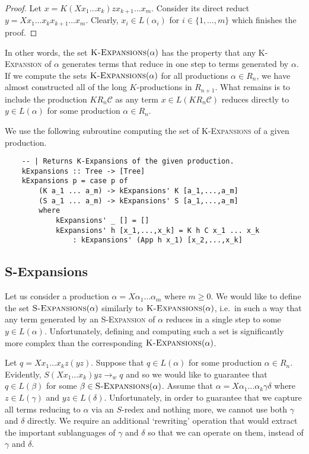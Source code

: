 \documentclass[11pt,a4paper]{amsart}
\theoremstyle{definition}
\newcommand{\KExpansions}[1]{\textsc{K-Expansions}(#1)}
\newcommand{\SExpansions}[1]{\textsc{S-Expansions}(#1)}
\begin{document}
\begin{proof}
    Let $x = K (X x_1 \ldots x_k) z x_{k+1} \ldots x_m$. Consider its direct reduct $y = X x_1 \ldots x_k x_{k+1} \ldots x_m$. Clearly, $x_i \in L(\alpha_i)$ for $i \in \{1,\ldots,m\}$ which finishes the proof.
\end{proof}

In other words, the set $\KExpansions{\alpha}$ has the property that any \textsc{K-Expansion} of $\alpha$ generates terms that reduce in one step to terms generated by $\alpha$. If we compute the sets $\KExpansions{\alpha}$ for all productions $\alpha \in R_n$, we have almost constructed all of the long $K$-productions in $R_{n+1}$. What remains is to include the production $K R_n \mathcal{C}$ as any term $x \in L(K R_n \mathcal{C})$ reduces directly to $y \in L(\alpha)$ for some production $\alpha \in R_n$.

We use the following subroutine computing the set of \textsc{K-Expansions} of a given production.

\begin{lstlisting}
    -- | Returns K-Expansions of the given production.
    kExpansions :: Tree -> [Tree]
    kExpansions p = case p of
        (K a_1 ... a_m) -> kExpansions' K [a_1,...,a_m]
        (S a_1 ... a_m) -> kExpansions' S [a_1,...,a_m]
        where
            kExpansions' _ [] = []
            kExpansions' h [x_1,...,x_k] = K h C x_1 ... x_k
                : kExpansions' (App h x_1) [x_2,...,x_k]
\end{lstlisting}

\subsection{S-Expansions}\label{sec:s-expansions}
Let us consider a production $\alpha = X \alpha_1 \ldots \alpha_m$ where $m \geq 0$. We would like to define the set $\SExpansions{\alpha}$ similarly to $\KExpansions{\alpha}$, i.e.~in such a way that any term generated by an \textsc{S-Expansion} of $\alpha$ reduces in a single step to some $y \in L(\alpha)$. Unfortunately, defining and computing such a set is significantly more complex than the corresponding $\KExpansions{\alpha}$.

Let $q = X x_1 \ldots x_k z (y z)$. Suppose that $q \in L(\alpha)$ for some production $\alpha \in R_n$. Evidently, $S (X x_1 \ldots x_k) y z \to_w q$ and so we would like to guarantee that $q \in L(\beta)$ for some $\beta \in \SExpansions{\alpha}$. Assume that $\alpha = X \alpha_1 \ldots \alpha_k \gamma \delta$ where $z \in L(\gamma)$ and $yz \in L(\delta)$. Unfortunately, in order to guarantee that we capture all terms reducing to $\alpha$ via an $S$-redex and nothing more, we cannot use both $\gamma$ and $\delta$ directly. We require an additional `rewriting' operation that would extract the important sublanguages of $\gamma$ and $\delta$ so that we can operate on them, instead of $\gamma$ and $\delta$. 
\end{document}
